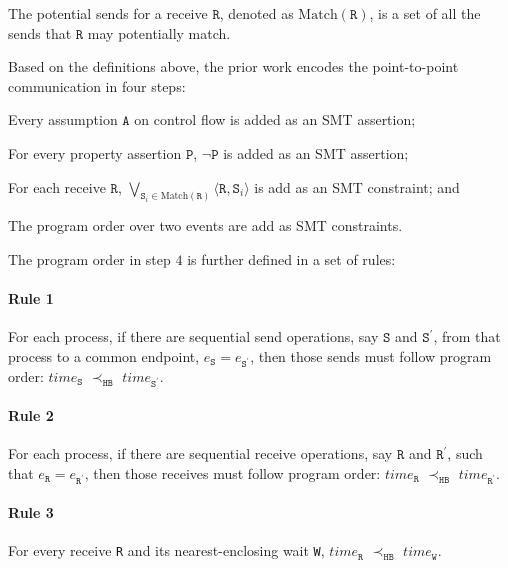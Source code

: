 \begin{definition}\label{def:potential}
The potential sends for a receive $\mathtt{R}$, denoted as $\mathrm{Match}(\mathtt{R})$, is a set of all the sends that $\mathtt{R}$ may potentially match.
\end{definition}

Based on the definitions above, the prior work encodes the point-to-point communication in four steps: 
\begin{compactenum}
\item Every assumption $\mathtt{A}$ on control flow is added as an SMT assertion;
\item For every property assertion $\mathtt{P}$, $\neg \mathtt{P}$ is added as an SMT assertion;
\item For each receive $\mathtt{R}$, $\bigvee_{\mathtt{S}_i \in \mathrm{Match}(\mathtt{R})} \langle\mathtt{R},\mathtt{S}_i\rangle$ is add as an SMT constraint; and
\item The program order over two events are add as SMT constraints. 
\end{compactenum}

The program order in step $4$ is further defined in a set of rules: 

\paragraph*{Rule 1} For each process, if there are sequential send
operations, say $\mathtt{S}$ and $\mathtt{S^\prime}$, from that process 
to a common endpoint, $e_\mathtt{S} = e_\mathtt{S^\prime}$, then those
sends must follow program order: $\mathit{time}_\mathtt{S}$
$\prec_\mathtt{HB}$ $\mathit{time}_\mathtt{S^\prime}$.

\paragraph*{Rule 2} For each process, if there are sequential receive
operations, say $\mathtt{R}$ and $\mathtt{R^\prime}$, such that $e_\mathtt{R} = e_\mathtt{R^\prime}$, then those
receives must follow program order: $\mathit{time}_\mathtt{R}$
$\prec_\mathtt{HB}$ $\mathit{time}_\mathtt{R^\prime}$.

\paragraph*{Rule 3} For every receive \texttt{R} and its nearest-enclosing wait \texttt{W}, $\mathit{time}_\mathtt{R}$ $\prec_\mathtt{HB}$ $\mathit{time}_\mathtt{W}$.

